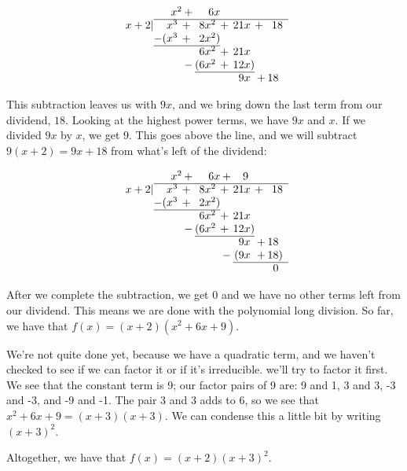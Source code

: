 {\begin{equation*}
\begin{array}{r@{}r@{}c@{}r@{}c@{}r@{}c@{}r}
& x^2 & + & 6x &  &  \phantom{x}& & \\ \cline{2-8}
x+2  \vert & x^3 \phantom{)}& + \phantom{)} & 8x^2 \phantom{)}& + \phantom{)} & 21x \phantom{)}& + \phantom{)} & 18\\
& -(x^3 \phantom{)} & + \phantom{)} & 2x^2) & & & & \\ \cline{2-4}
 & & & 6x^2 \phantom{)} & + \phantom{)} & 21x \phantom{)} & & \\
 & & - & (6x^2 \phantom{)} & + \phantom{)} & 12x) & & \\ \cline{4-6}
 & & & & & 9x \phantom{)} & + & 18 \phantom{)} \\ 
 \end{array}
\end{equation*}

\noindent
This subtraction leaves us with $9x$, and we bring down the last term from our dividend, $18$. Looking at the highest power terms, we have $9x$ and $x$. If we divided $9x$ by $x$, we get $9$. This goes above the line, and we will subtract $9(x+2)=9x+18$ from what's left of the dividend:


\begin{equation*}
\begin{array}{r@{}r@{}c@{}r@{}c@{}r@{}c@{}r}
& x^2 & + & 6x & + & 9 \phantom{x}& & \\ \cline{2-8}
x+2  \vert & x^3 \phantom{)}& + \phantom{)} & 8x^2 \phantom{)}& + \phantom{)} & 21x \phantom{)}& + \phantom{)} & 18\\
& -(x^3 \phantom{)} & + \phantom{)} & 2x^2) & & & & \\ \cline{2-4}
 & & & 6x^2 \phantom{)} & + \phantom{)} & 21x \phantom{)} & & \\
 & & - & (6x^2 \phantom{)} & + \phantom{)} & 12x) & & \\ \cline{4-6}
 & & & & & 9x \phantom{)} & + & 18 \phantom{)} \\ 
 & & & & - & (9x \phantom{)} & + & 18) \\  \cline{6-8}
 & & & &  & & & 0 \phantom{)}
\end{array}
\end{equation*}

\noindent
After we complete the subtraction, we get $0$ and we have no other terms left from our dividend. This means we are done with the polynomial long division. So far, we have that $f(x) = (x+2)(x^2+6x+9)$.

We're not quite done yet, because we have a quadratic term, and we haven't checked to see if we can factor it or if it's irreducible. we'll try to factor it first. We see that the constant term is 9; our factor pairs of 9 are: 9 and 1, 3 and 3, -3 and -3, and -9 and -1. The pair 3 and 3 adds to 6, so we see that $x^2+6x+9 = (x+3)(x+3)$. We can condense this a little bit by writing $(x+3)^2$.

Altogether, we have that $f(x)=(x+2)(x+3)^2$.}\\

